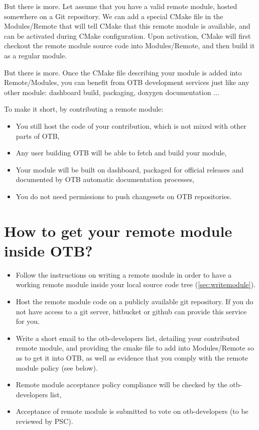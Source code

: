 But there is more. Let assume that you have a valid remote module, hosted somewhere on a Git repository. We can add a special CMake file in the Modules/Remote that will tell CMake that this remote module is available, and can be activated during CMake configuration. Upon activation, CMake will first checkout the remote module source code into Modules/Remote, and then build it as a regular module.

But there is more. Once the CMake file describing your module is added into Remote/Modules, you can benefit from OTB development services just like any other module: dashboard build, packaging, doxygen documentation ...

To make it short, by contributing a remote module:

\begin{itemize}
       \item  You still host the code of your contribution, which is not mixed with other parts of OTB,
       \item  Any user building OTB will be able to fetch and build your module,
       \item  Your module will be built on dashboard, packaged for official releases and documented by OTB automatic documentation processes,
       \item  You do not need permissions to push changesets on OTB repositories.
\end{itemize}

\section{How to get your remote module inside OTB? }

\begin{itemize}
    \item Follow the instructions on writing a remote module in order to have a working remote module inside your local source code tree (\ref{sec:writemodule}).
    \item Host the remote module code on a publicly available git repository. If you do not have access to a git server, bitbucket or github can provide this service for you.
    \item Write a short email to the otb-developers list, detailing your contributed remote module, and providing the cmake file to add into Modules/Remote so as to get it into OTB, as well as evidence that you comply with the remote module policy (see below).
    \item Remote module acceptance policy compliance will be checked by the otb-developers list,
    \item Acceptance of remote module is submitted to vote on otb-developers (to be reviewed by PSC). 
 \end{itemize}

